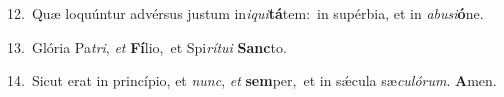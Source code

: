 {\numbfont\textcolor{\numbcolor}{12.}}~Quæ loquúntur advérsus justum in\-\textit{i}\-\textit{qui}\textbf{tá}tem:~\star in supérbia, et in \textit{ab}\-\textit{u}\textit{si}\textbf{ó}ne.\par
{\numbfont\textcolor{\numbcolor}{13.}}~Glória Pa\-\textit{tri}\-, \textit{et} \textbf{Fí}\-lio,~\star et Spi\-\textit{rí}\-\textit{tu}\textit{i} \textbf{Sanc}\-to.\par
{\numbfont\textcolor{\numbcolor}{14.}}~Sicut erat in princípio, et \textit{nunc}\-, \textit{et} \textbf{sem}\-per,~\star et in sǽcula sæ\-\textit{cu}\-\textit{ló}\textit{rum}. \textbf{A}\-men.\par
